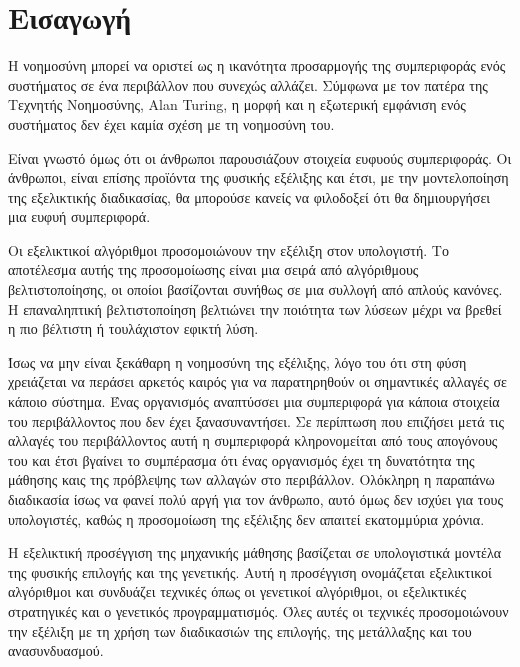 \section{Εισαγωγή}
Η νοημοσύνη μπορεί να οριστεί ως η ικανότητα προσαρμογής της συμπεριφοράς ενός συστήματος σε ένα περιβάλλον που συνεχώς αλλάζει. Σύμφωνα με τον πατέρα της Τεχνητής Νοημοσύνης, Alan Turing, η μορφή και η εξωτερική εμφάνιση ενός συστήματος δεν έχει καμία σχέση με τη νοημοσύνη του.

Είναι γνωστό όμως ότι οι άνθρωποι παρουσιάζουν στοιχεία ευφυούς συμπεριφοράς. Οι άνθρωποι, είναι επίσης προϊόντα της φυσικής εξέλιξης και έτσι, με την μοντελοποίηση της εξελικτικής διαδικασίας, θα μπορούσε κανείς να φιλοδοξεί ότι θα δημιουργήσει μια ευφυή συμπεριφορά.

Οι εξελικτικοί αλγόριθμοι προσομοιώνουν την εξέλιξη στον υπολογιστή. Το αποτέλεσμα αυτής της προσομοίωσης είναι μια σειρά από αλγόριθμους βελτιστοποίησης, οι οποίοι βασίζονται συνήθως σε μια συλλογή από απλούς κανόνες. Η επαναληπτική βελτιστοποίηση βελτιώνει την ποιότητα των λύσεων μέχρι να βρεθεί η πιο βέλτιστη ή τουλάχιστον εφικτή λύση.

Ίσως να μην είναι ξεκάθαρη η νοημοσύνη της εξέλιξης, λόγο του ότι στη φύση χρειάζεται να περάσει αρκετός καιρός για να παρατηρηθούν οι σημαντικές αλλαγές σε κάποιο σύστημα. Ένας οργανισμός αναπτύσσει μια συμπεριφορά για κάποια στοιχεία του περιβάλλοντος που δεν έχει ξανασυναντήσει. Σε περίπτωση που επιζήσει μετά τις αλλαγές του περιβάλλοντος αυτή η συμπεριφορά κληρονομείται από τους απογόνους του και έτσι βγαίνει το συμπέρασμα ότι ένας οργανισμός έχει τη δυνατότητα της μάθησης καις της πρόβλεψης των αλλαγών στο περιβάλλον. Ολόκληρη η παραπάνω διαδικασία ίσως να φανεί πολύ αργή για τον άνθρωπο, αυτό όμως δεν ισχύει για τους υπολογιστές, καθώς η προσομοίωση της εξέλιξης δεν απαιτεί εκατομμύρια χρόνια.

Η εξελικτική προσέγγιση της μηχανικής μάθησης βασίζεται σε υπολογιστικά μοντέλα της φυσικής επιλογής και της γενετικής. Αυτή η προσέγγιση ονομάζεται εξελικτικοί αλγόριθμοι και συνδυάζει τεχνικές όπως οι γενετικοί αλγόριθμοι, οι εξελικτικές στρατηγικές και ο γενετικός προγραμματισμός. Όλες αυτές οι τεχνικές προσομοιώνουν την εξέλιξη με τη χρήση των διαδικασιών της επιλογής, της μετάλλαξης και του ανασυνδυασμού.

 